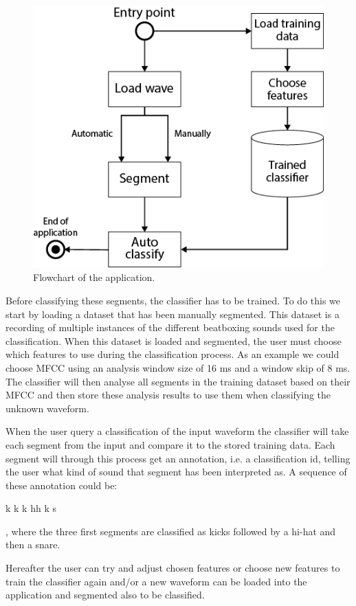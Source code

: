 \begin{figure}
\begin{center}
\includegraphics[scale=0.6]{fig/Application_flowchart.png}
\caption{Flowchart of the application.}
\label{app-flowchart}
\end{center}
\end{figure}

Before classifying these segments, the classifier has to be trained. To do this we start by loading a dataset that has been manually segmented. This dataset is a recording of multiple instances of the different beatboxing sounds used for the classification. When this dataset is loaded and segmented, the user must choose which features to use during the classification process. As an example we could choose MFCC using an analysis window size of 16 ms and a window skip of 8 ms. The classifier will then analyse all segments in the training dataset based on their MFCC and then store these analysis results to use them when classifying the unknown waveform.

When the user query a classification of the input waveform the classifier will take each segment from the input and compare it to the stored training data. Each segment will through this process get an annotation, i.e. a classification id, telling the user what kind of sound that segment has been interpreted as. A sequence of these annotation could be:

\begin{center}
k k k hh k s
\end{center}

, where the three first segments are classified as kicks followed by a hi-hat and then a snare.

Hereafter the user can try and adjust chosen features or choose new features to train the classifier again and/or a new waveform can be loaded into the application and segmented also to be classified.